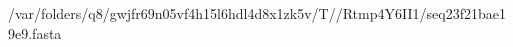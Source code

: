 \documentclass[10pt]{article}
\begin{document}
\begin{texshade}{/var/folders/q8/gwjfr69n05vf4h15l6hdl4d8x1zk5v/T//Rtmp4Y6II1/seq23f21bae19e9.fasta}
\hidelogoscale
{}
\showlegend
\end{texshade}
\end{document}
